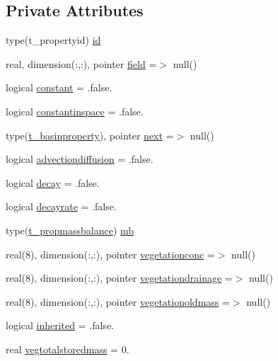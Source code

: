 \subsection*{Private Attributes}
\begin{DoxyCompactItemize}
\item 
type(t\+\_\+propertyid) \mbox{\hyperlink{structmodulebasin_1_1t__basinproperty_af3d15457781da0f5fb5de2953135707b}{id}}
\item 
real, dimension(\+:,\+:), pointer \mbox{\hyperlink{structmodulebasin_1_1t__basinproperty_a93f28eecfab16882c7957facc00eab2a}{field}} =$>$ null()
\item 
logical \mbox{\hyperlink{structmodulebasin_1_1t__basinproperty_a0d5c7d29ad8d2b3509ad431ec4b36bce}{constant}} = .false.
\item 
logical \mbox{\hyperlink{structmodulebasin_1_1t__basinproperty_ad0d442666428f79fd53d85668d5970b7}{constantinspace}} = .false.
\item 
type(\mbox{\hyperlink{structmodulebasin_1_1t__basinproperty}{t\+\_\+basinproperty}}), pointer \mbox{\hyperlink{structmodulebasin_1_1t__basinproperty_a71c849729becbffda6f380ab82a31a99}{next}} =$>$ null()
\item 
logical \mbox{\hyperlink{structmodulebasin_1_1t__basinproperty_ab74b0eece9c536484a3ac1645e04ec14}{advectiondiffusion}} = .false.
\item 
logical \mbox{\hyperlink{structmodulebasin_1_1t__basinproperty_af748bd330e049e47f79a279007d4c068}{decay}} = .false.
\item 
logical \mbox{\hyperlink{structmodulebasin_1_1t__basinproperty_a9a78520342209901fe347d497d731ede}{decayrate}} = .false.
\item 
type(\mbox{\hyperlink{structmodulebasin_1_1t__propmassbalance}{t\+\_\+propmassbalance}}) \mbox{\hyperlink{structmodulebasin_1_1t__basinproperty_a260a326a6fd8e093ef0a2cf491bfaedf}{mb}}
\item 
real(8), dimension(\+:,\+:), pointer \mbox{\hyperlink{structmodulebasin_1_1t__basinproperty_a2a29cb3968314127e47143c0cba27bbf}{vegetationconc}} =$>$ null()
\item 
real(8), dimension(\+:,\+:), pointer \mbox{\hyperlink{structmodulebasin_1_1t__basinproperty_a62388cf8da1b20729c272309241340c3}{vegetationdrainage}} =$>$ null()
\item 
real(8), dimension(\+:,\+:), pointer \mbox{\hyperlink{structmodulebasin_1_1t__basinproperty_a80f4cc95218cf68883473b90a6b99423}{vegetationoldmass}} =$>$ null()
\item 
logical \mbox{\hyperlink{structmodulebasin_1_1t__basinproperty_a44ea608c054ab31c8a6189714bb3021b}{inherited}} = .false.
\item 
real \mbox{\hyperlink{structmodulebasin_1_1t__basinproperty_a75dae9c805abb82e2512b65b7701a3a5}{vegtotalstoredmass}} = 0.
\end{DoxyCompactItemize}


